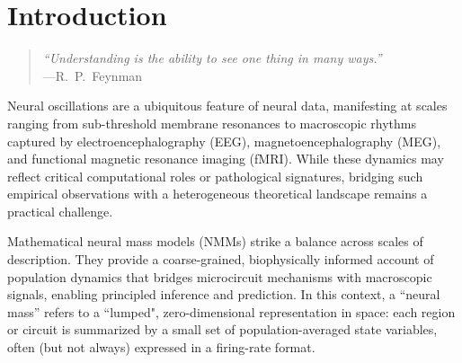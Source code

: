 \documentclass[12pt]{article}
\numberwithin{equation}{section}
\newcommand{\rev}[1]{\begingroup\color{navyblue}#1\endgroup}
\begin{document}
\setcounter{tocdepth}{2}
\tableofcontents

\clearpage


\section{Introduction} 

\begin{quote}
\emph{``Understanding is the ability to see one thing in many ways.''}\\[4pt]
\hfill ---R.~P.~Feynman
\end{quote}

\rev{Neural oscillations are a ubiquitous feature of neural data, manifesting at scales ranging from sub-threshold membrane resonances to macroscopic rhythms captured by electroencephalography (EEG), magnetoencephalography (MEG), and functional magnetic resonance imaging (fMRI). While these dynamics may reflect critical computational roles or pathological signatures, bridging such empirical observations with a heterogeneous theoretical landscape remains a practical challenge.}
  
  
  \rev{Mathematical neural mass models (NMMs) strike a balance across scales of description. They provide a coarse-grained, biophysically informed account of population dynamics that bridges microcircuit mechanisms with macroscopic signals, enabling principled inference and prediction. In this context, a ``neural mass'' refers to a ``lumped", zero-dimensional representation in space: each region or circuit is summarized by a small set of population-averaged state variables, often (but not always) expressed in a firing-rate format.}
  
\end{document}

